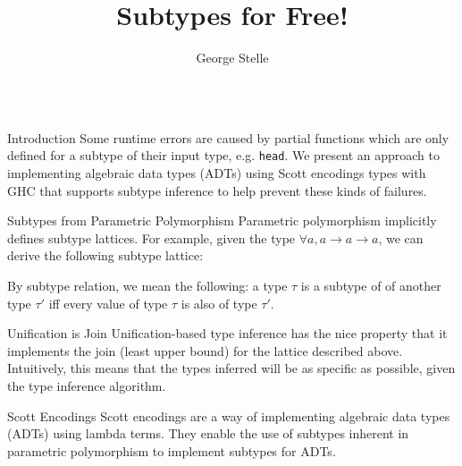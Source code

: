 \documentclass[final]{beamer}
\title{Subtypes for Free!}
\author{George Stelle}
\institute{University of New Mexico}
\begin{document}
\begin{frame}[fragile]
\begin{columns}
\begin{column}{.285\textwidth}

\begin{block}{Introduction}
\vspace{0.5cm}
Some runtime errors are caused by partial functions which are only defined for a
subtype of their input type, e.g. \texttt{head}. We present an approach to
implementing algebraic data types (ADTs) using Scott encodings types with GHC
that supports subtype inference to help prevent these kinds of failures.
\end{block}
\vspace{2cm}
\begin{block}{Subtypes from Parametric Polymorphism}
\vspace{0.5cm}
Parametric polymorphism implicitly defines subtype lattices. For example, given
the type $\forall a, a \rightarrow a \rightarrow a$, we can derive the following
subtype lattice:
\vspace{0.5cm}
\begin{figure}[!h]
\centering
{}
\end{figure}
By subtype relation, we mean the following: a type $\tau$ is a subtype of of
another type $\tau'$ iff every value of type $\tau$ is also of type $\tau'$.
\end{block}
\vspace{2cm}
\begin{block}{Unification is Join}
\vspace{0.5cm}
Unification-based type inference has the nice property that it implements the
join (least upper bound) for the lattice described above. Intuitively, this
means that the types inferred will be as specific as possible, given the type
inference algorithm. 
\end{block}
\vspace{2cm}
\begin{block}{Scott Encodings}
\vspace{0.5cm}
Scott encodings are a way of implementing algebraic data types (ADTs) using
lambda terms. They enable the use of subtypes inherent in parametric
polymorphism to implement subtypes for ADTs. 
\end{block}
\end{column}


\end{columns}
\end{frame}
\end{document}
